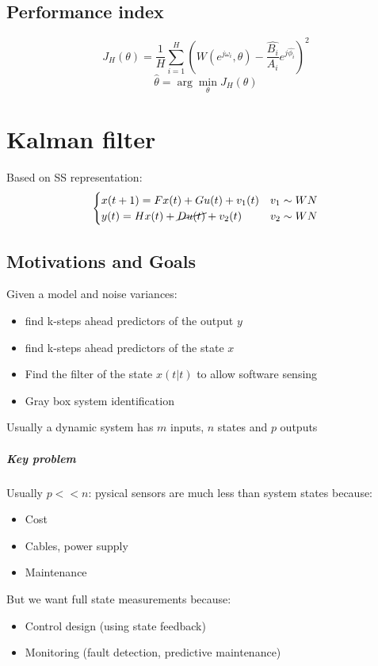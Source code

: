\documentclass{report}
\begin{document}
\section{Performance index}
\[
J_H(\theta)=
\frac{1}{H}
\sum_{i=1}^H
\left(
W(e^{j\omega_i},\theta)
-
\frac{\hat{B_i}}{A_i}e^{j\hat{\phi_i}}
\right)^2
\]
\[
\hat{\theta}=\arg \min_\theta J_H(\theta)
\]

\chapter{Kalman filter}
Based on SS representation:
\[
\begin{cases}
x(t+1)=Fx(t)+Gu(t)+v_1(t)&v_1\sim WN\\
y(t)=Hx(t)+\cancel{Du(t)}+v_2(t)&v_2\sim WN
\end{cases}
\]
\section{Motivations and Goals}
Given a model and noise variances:
\begin{itemize}
\item find k-steps ahead predictors of the output $y$
\item find k-steps ahead predictors of the state $x$
\item Find the filter of the state $\hat{x}(t|t)$ to allow software sensing
\item Gray box system identification
\end{itemize}
Usually a dynamic system has $m$ inputs, $n$ states and $p$ outputs
\paragraph{Key problem} Usually $p<<n$: pysical sensors are much less than system states because:
\begin{itemize}
\item Cost
\item Cables, power supply
\item Maintenance
\end{itemize}
But we want full state measurements because:
\begin{itemize}
\item Control design (using state feedback)
\item Monitoring (fault detection, predictive maintenance)
\end{itemize}
\end{document}
